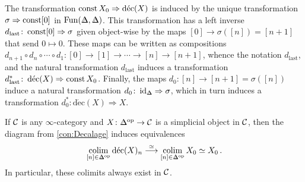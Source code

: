 \begin{con}
	The transformation $\operatorname{const} X_0\Rightarrow \operatorname{d\acute{e}c}(X)$ is induced by the unique transformation $\sigma\Rightarrow \operatorname{const} [0]$ in $\Fun(\IDelta,\IDelta)$. This transformation has a left inverse $d_\mathrm{last}\colon \operatorname{const} [0]\Rightarrow \sigma$ given object-wise by the maps $[0]\rightarrow \sigma([n])=[n+1]$ that send $0\mapsto 0$. These maps can be written as compositions $d_{n+1}\circ d_n\circ \dotsb\circ d_1\colon [0]\rightarrow [1]\rightarrow \dotsb\rightarrow [n]\rightarrow [n+1]$, whence the notation $d_\mathrm{last}$, and the natural transformation $d_\mathrm{last}$ induces a transformation $d_\mathrm{last}^*\colon \operatorname{d\acute{e}c}(X)\Rightarrow \operatorname{const} X_0$. Finally, the maps $d_0\colon [n]\rightarrow [n+1]=\sigma([n])$ induce a natural transformation $d_0\colon \id_{\IDelta}\Rightarrow \sigma$, which in turn induces a transformation $d_0^*\colon \operatorname{d\acute{e}c}(X)\Rightarrow X$.
\end{con}
\begin{lem}\label{lem:DecalageColimit}
	If $\mathcal{C}$ is any $\infty$-category and $X\colon \IDelta^\op\rightarrow\Cc$ is a simplicial object in $\mathcal{C}$, then the diagram from \cref{con:Decalage} induces equivalences
	\begin{equation*}
		\colimit_{[n]\in\IDelta^\op}\operatorname{d\acute{e}c}(X)_n\overset{\simeq}{\longrightarrow}\colimit_{[n]\in\IDelta^\op}X_0\simeq X_0\,.
	\end{equation*}
	In particular, these colimits always exist in $\mathcal{C}$.
\end{lem}
